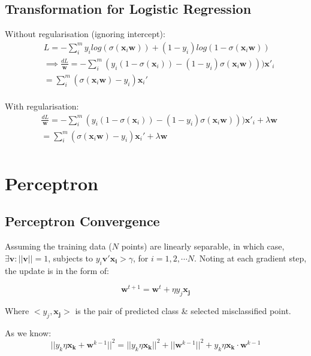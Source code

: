 \documentclass{article}
\newcommand{\V}[1]{\boldsymbol{#1}}
\begin{document}
\subsection{Transformation for Logistic Regression}

Without regularisation (ignoring intercept):
\begin{equation}
\begin{aligned}
&L=-\sum_{i}^my_ilog(\sigma(\V{x}_i\V{w}))+(1-y_i)log(1-\sigma(\V{x}_i\V{w}))\\
&\implies
\frac{dL}{\V{w}}=-\sum_{i}^m(y_i(1-\sigma(\V{x}_i))-(1-y_i)\sigma(\V{x}_i\V{w})))\V{x}'_i\\
&=\sum_{i}^m(\sigma(\V{x}_i\V{w})-y_i)\V{x}_i'\\
\end{aligned}
\end{equation}

With regularisation:
\begin{equation}
\begin{aligned}
&\frac{dL}{\V{w}}=-\sum_{i}^m(y_i(1-\sigma(\V{x}_i))-(1-y_i)\sigma(\V{x}_i\V{w})))\V{x}'_i+\lambda\V{w}\\
&=\sum_{i}^m(\sigma(\V{x}_i\V{w})-y_i)\V{x}_i'+\lambda\V{w}\\
\end{aligned}
\end{equation}

\section{Perceptron}
\subsection{Perceptron Convergence}
Assuming the training data (\(N\) points) are linearly separable, in which case, 
\(\exists \V{v}: ||\V{v}||=1\), subjects to \(y_i\V{v'}\V{x_i}>\gamma\), for
\(i=1, 2, \cdots N\).
Noting at each gradient step, the update is in the form of:

\begin{equation}
\V{w}^{t+1}=\V{w}^t+\eta y_j\V{x_j}
\end{equation}

Where \(<y_j, \V{x_j}>\) is the pair of predicted class \& selected misclassified point.

As we know:
\begin{equation}
||y_k\eta\V{x_k} +\V{w}^{k-1}||^2=||y_k\eta\V{x_k}||^2+||\V{w}^{k-1}||^2+y_k\eta\V{x_k}\cdot \V{w}^{k-1}
\end{equation}
\end{document}
